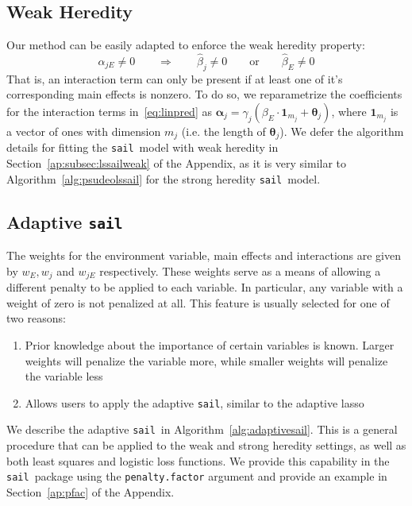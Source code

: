 \documentclass[12pt,letter]{article}\usepackage[]{graphicx}\usepackage[]{color}
\newcommand{\sail}{\texttt{sail}}
\newcommand{\tm}[1]{\textrm{{#1}}}
\newcommand{\balpha}{\boldsymbol{\alpha}}
\newcommand{\mb}[1]{\mathbf{#1}}
\newcommand{\btheta}{\boldsymbol{\theta}}
\begin{document}
\subsection{Weak Heredity}
Our method can be easily adapted to enforce the weak heredity property:
\begin{equation}
	\hat{\alpha}_{jE} \neq 0 \qquad \Rightarrow \qquad \hat{\beta}_j \neq 0 \qquad \tm{or} \qquad \hat{\beta}_E \neq 0   \label{eq:heredity2} \nonumber
\end{equation}
That is, an interaction term can only be present if at least one of it's corresponding main effects is nonzero. To do so, we reparametrize the coefficients for the interaction terms in~\eqref{eq:linpred} as $\balpha_{j} = \gamma_{j}  (\beta_E \cdot \mb{1}_{m_j} + \btheta_j)$, where $\mb{1}_{m_j}$ is a vector of ones with dimension $m_j$ (i.e. the length of $\btheta_j$). We defer the algorithm details for fitting the \sail ~model with weak heredity in Section~\ref{ap:subsec:lssailweak} of the Appendix, as it is very similar to Algorithm~\ref{alg:psudeolssail} for the strong heredity \sail ~model.


\subsection{Adaptive \sail}

The weights for the environment variable, main effects and interactions are given by $w_E, w_j$ and $w_{jE}$ respectively. These weights serve as a means of allowing a different penalty to be applied to each variable. In particular, any variable with a weight of zero is not penalized at all. This feature is usually selected for one of two reasons:

\begin{enumerate}
	\item Prior knowledge about the importance of certain variables is known. Larger weights will penalize the variable more, while smaller weights will penalize the variable less
	\item Allows users to apply the adaptive \sail, similar to the adaptive lasso~\citep{zou2006adaptive}
\end{enumerate}

We describe the adaptive \sail ~in Algorithm~\ref{alg:adaptivesail}. This is a general procedure that can be applied to the weak and strong heredity settings, as well as both least squares and logistic loss functions. We provide this capability in the \sail ~package using the \texttt{penalty.factor} argument and provide an example in Section~\ref{ap:pfac} of the Appendix.
\end{document}
